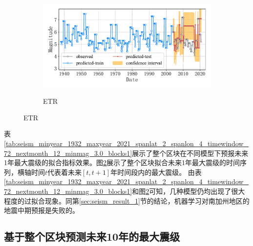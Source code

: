 \begin{figure}[!htbp]
\begin{subfigure}[b]{0.45\textwidth}
  \end{subfigure}
  ~
  \begin{subfigure}[b]{0.45\textwidth}
    \caption{ETR}
    \vspace{-0.2cm}
    \includegraphics[width=\textwidth]{Img/chap5_seism/total/seism_etr_minyear_1932_maxyear_2021_spanlat_2_spanlon_4_timewindow_72_nextmonth_12_minmag_3.0_blocks1.pdf}
    \vspace{-1cm}
    \label{fig:seism_etr_minyear_1932_maxyear_2021_spanlat_2_spanlon_4_timewindow_72_nextmonth_12_minmag_3.0_blocks1}
  \end{subfigure}
  \label{fig:seism_minyear_1932_maxyear_2021_spanlat_2_spanlon_4_timewindow_72_nextmonth_12_minmag_3.0_blocks1}
\end{figure}

表\ref{tab:seism_minyear_1932_maxyear_2021_spanlat_2_spanlon_4_timewindow_72_nextmonth_12_minmag_3.0_blocks1}展示了整个区块在不同模型下预报未来1年最大震级的拟合指标效果。图\ref{fig:seism_minyear_1932_maxyear_2021_spanlat_2_spanlon_4_timewindow_72_nextmonth_12_minmag_3.0_blocks1}展示了整个区块拟合未来1年最大震级的时间序列，横轴时间$t$代表着未来$[t,t+1]$年时间段内的最大震级。
由表\ref{tab:seism_minyear_1932_maxyear_2021_spanlat_2_spanlon_4_timewindow_72_nextmonth_12_minmag_3.0_blocks1}和图\ref{fig:seism_minyear_1932_maxyear_2021_spanlat_2_spanlon_4_timewindow_72_nextmonth_12_minmag_3.0_blocks1}可知，几种模型仍均出现了很大程度的过拟合现象。同第\ref{sec:seism_result_1}节的结论，机器学习对南加州地区的地震中期预报是失败的。

\subsection{基于整个区块预测未来10年的最大震级}\label{sec:seism_result_10}

